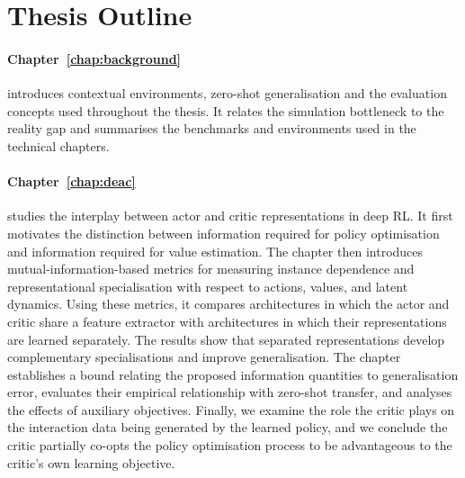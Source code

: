 
\section{Thesis Outline}
\label{sec:intro_outline}

\paragraph{Chapter~\ref{chap:background}} introduces contextual environments, zero-shot generalisation and the evaluation concepts used throughout the thesis. It relates the simulation bottleneck to the reality gap and summarises the benchmarks and environments used in the technical chapters.

\paragraph{Chapter~\ref{chap:deac}} studies the interplay between actor and critic representations in deep RL. It first motivates the distinction between information required for policy optimisation and information required for value estimation. The chapter then introduces mutual-information-based metrics for measuring instance dependence and representational specialisation with respect to actions, values, and latent dynamics. Using these metrics, it compares architectures in which the actor and critic share a feature extractor with architectures in which their representations are learned separately. The results show that separated representations develop complementary specialisations and improve generalisation. The chapter establishes a bound relating the proposed information quantities to generalisation error, evaluates their empirical relationship with zero-shot transfer, and analyses the effects of auxiliary objectives. Finally, we examine the role the critic plays on the interaction data being generated by the learned policy, and we conclude the critic partially co-opts the policy optimisation process to be advantageous to the critic's own learning objective.


